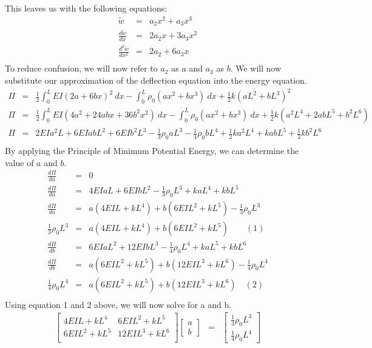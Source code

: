 \documentclass[a4paper]{article}
\begin{document}
This leaves us with the following equations:
\begin{eqnarray*}
\widetilde{w} & = & a_{2}x^{2} + a_{3}x^{3}\\
\frac{d\tilde{w}}{dx} & = & 2a_{2}x+3a_{3}x^{2}\\
\frac{d^{2}\tilde{w}}{dx^{2}} & = & 2a_{2} + 6a_{3}x\\
\end{eqnarray*}
To reduce confusion, we will now refer to $a_{2}$ as $a$ and $a_{3}$ as $b$.  We will now substitute our approximation of the deflection equation into the energy equation.
\begin{eqnarray*}
\Pi & = & \frac{1}{2} \int_{0}^{L}EI(2a+6bx)^{2} \ dx - \int_{0}^{L}\rho_{0}(ax^{2}+bx^{3}) \ dx + \frac{1}{2} k(aL^{2}+bL^{3})^{2}\\
\Pi & = & \frac{1}{2} \int_{0}^{L}EI(4a^{2}+24abx+36b^{2}x^{2}) \ dx - \int_{0}^{L}\rho_{0}(ax^{2}+bx^{3}) \ dx + \frac{1}{2} k(a^{2}L^{4}+2abL^{5}+b^{2}L^{6})\\
\Pi & = & 2EIa^{2}L+6EIabL^{2} + 6EIb^{2}L^{3}-\frac{1}{3}\rho_{0}aL^{3}-\frac{1}{4}\rho_{0}bL^{4}+\frac{1}{2}ka^{2}L^{4}+kabL^{5}+\frac{1}{2}kb^{2}L^{6}\\
\end{eqnarray*} 
By applying the Principle of Minimum Potential Energy, we can determine the value of $a$ and $b$.
\begin{eqnarray*}
\frac{d\Pi}{da} & = & 0\\
\frac{d\Pi}{da} & = & 4EIaL + 6EIbL^{2}- \frac{1}{3}\rho_{0}L^{3} + kaL^{4} + kbL^{5}\\
\frac{d\Pi}{da} & = & a(4EIL+kL^{4}) + b(6EIL^{2}+kL^{5}) - \frac{1}{3}\rho_{0}L^{3}\\
\frac{1}{3}\rho_{0}L^{3} & = & a(4EIL+kL^{4}) + b(6EIL^{2}+kL^{5}) \qquad (1)\\
\frac{d\Pi}{db} & = & 6EIaL^{2} + 12EIbL^{3}-\frac{1}{4}\rho_{0}L^{4}+kaL^{5}+kbL^{6}\\
\frac{d\Pi}{db} & = & a(6EIL^{2}+kL^{5})+b(12EIL^{3}+kL^{6}) -\frac{1}{4}\rho_{0}L^{4} \\
\frac{1}{4}\rho_{0}L^{4} & = & a(6EIL^{2}+kL^{5})+b(12EIL^{3}+kL^{6})  \quad (2)\\
\end{eqnarray*}
Using equation 1 and 2 above, we will now solve for a and b.
\begin{eqnarray*}
\begin{bmatrix}
4EIL+kL^{4} & 6EIL^{2} + kL^{5}\\
6EIL^{2}+kL^{5} & 12EIL^{3}+kL^{6}\\
\end{bmatrix}
\begin{bmatrix}
a \\ 
b
\end{bmatrix}
 & = & \begin{bmatrix}
\frac{1}{3}\rho_{0}L^{3}\\[3pt]
\frac{1}{4}\rho_{0}L^{4}
\end{bmatrix}\\
\end{eqnarray*}
\end{document}
